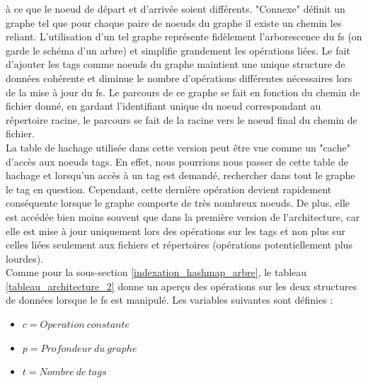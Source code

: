 \documentclass[a4paper, 12pt]{article}
\begin{document}
à ce que le noeud de départ et d'arrivée soient différents. "Connexe" définit un graphe tel que 
pour chaque paire de noeuds du graphe il existe un chemin les reliant. L'utilisation d'un tel 
graphe représente fidèlement l'arborescence du \acrshort{fs} (on garde le schéma d'un arbre) 
et simplifie grandement les opérations liées. Le fait d'ajouter les tags comme noeuds du graphe 
maintient une unique structure de données cohérente et diminue le nombre d'opérations différentes 
nécessaires lors de la mise à jour du \acrshort{fs}. Le parcours de ce graphe se fait en 
fonction du chemin de fichier donné, en gardant l'identifiant unique du noeud correspondant au 
répertoire racine, le parcours se fait de la racine vers le noeud final du chemin de fichier.
\\
La table de hachage utilisée dans cette version peut être vue comme un "cache" d'accès aux noeuds 
tags. En effet, nous pourrions nous passer de cette table de hachage et lorsqu'un accès à un tag 
est demandé, rechercher dans tout le graphe le tag en question. Cependant, cette dernière opération 
devient rapidement conséquente lorsque le graphe comporte de très nombreux noeuds. De plus, elle est 
accédée bien moins souvent que dans la première version de l'architecture, car elle est mise à jour 
uniquement lors des opérations sur les tags et non plus sur celles liées seulement aux fichiers et 
répertoires (opérations potentiellement plus lourdes).
\\
Comme pour la sous-section \ref{indexation_hashmap_arbre}, le tableau 
\ref{tableau_architecture_2} donne un aperçu des opérations sur les deux structures de données 
lorsque le \acrshort{fs} est manipulé. Les variables suivantes sont définies :
\begin{itemize}
    \item $c = Operation \ constante$
    \item $p = Profondeur \ du \ graphe$
    \item $t = Nombre \ de \ tags$
\end{itemize}
\end{document}
